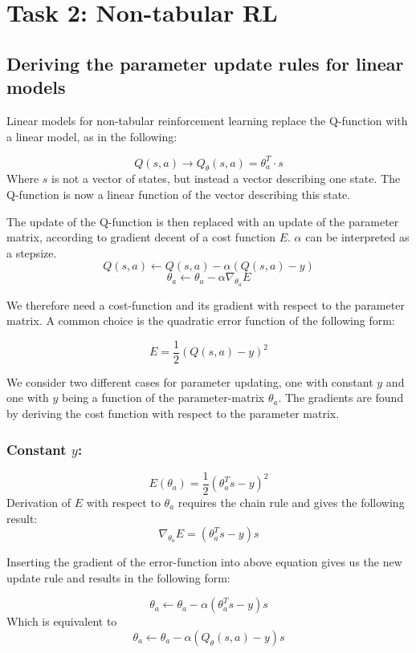 \section{Task 2: Non-tabular RL}
\subsection{Deriving the parameter update rules for linear models}

Linear models for non-tabular reinforcement learning replace the Q-function with a linear model, as in the following:

$$
Q(s,a) \rightarrow Q_{\theta}(s,a) = \theta_a ^{T} \cdot s 
$$
Where $s$ is not a vector of states, but instead a vector describing one state. The Q-function is now a linear function of the vector describing this state.

The update of the Q-function is then replaced with an update of the parameter matrix, according to gradient decent of a cost function $E$. $\alpha$ can be interpreted as a stepsize.
$$
Q(s,a) \leftarrow Q(s,a) - \alpha (Q(s,a) - y) 
$$
$$
\theta_a \leftarrow \theta_a - \alpha \nabla_{\theta_a} E 
$$

We therefore need a cost-function and its gradient with respect to the parameter matrix. A common choice is the quadratic error function of the following form:

$$
E = \frac{1}{2} (Q(s,a) - y)^2
$$

We consider two different cases for parameter updating, one with constant $y$ and one with $y$ being a function of the parameter-matrix $\theta_a$. The gradients are found by deriving the cost function with respect to the parameter matrix.

\subsubsection{Constant $y$:}

$$
E(\theta_a) = \frac{1}{2} (\theta_a ^{T} s - y)^2
$$
Derivation of $E$ with respect to $\theta_a$ requires the chain rule and gives the following result:
$$
\nabla_{\theta_a} E = (\theta_a ^{T} s - y)s
$$





Inserting the gradient of the error-function into above equation gives us the new update rule and results in the following form:

$$
\theta_a \leftarrow \theta_a - \alpha (\theta_a ^{T} s - y)s
$$
Which is equivalent to 
$$
\theta_a \leftarrow \theta_a - \alpha (Q_{\theta}(s,a) - y)s
$$


